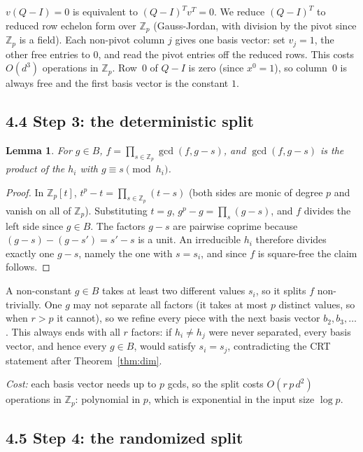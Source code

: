 \documentclass[11pt,a4paper]{article}
\newtheorem{lemma}[theorem]{Lemma}
\newcommand{\Zp}{\mathbb{Z}_p}
\begin{document}
$v (Q - I) = 0$ is equivalent to $(Q - I)^{T} v^{T} = 0$. We reduce $(Q - I)^{T}$ to reduced row
echelon form over $\Zp$ (Gauss-Jordan, with division by the pivot since $\Zp$ is a field). Each
non-pivot column $j$ gives one basis vector: set $v_j = 1$, the other free entries to $0$, and
read the pivot entries off the reduced rows. This costs $O(d^3)$ operations in $\Zp$. Row~$0$ of
$Q - I$ is zero (since $x^0 = 1$), so column~$0$ is always free and the first basis vector is
the constant $1$.

\subsection*{4.4 Step 3: the deterministic split}

\begin{lemma}
\label{lem:split}
For $g \in B$, $\displaystyle f = \prod_{s \in \Zp} \gcd(f, g - s)$, and $\gcd(f, g - s)$ is the
product of the $h_i$ with $g \equiv s \pmod{h_i}$.
\end{lemma}

\begin{proof}
In $\Zp[t]$, $t^p - t = \prod_{s \in \Zp}(t - s)$ (both sides are monic of degree $p$ and vanish
on all of $\Zp$). Substituting $t = g$, $g^p - g = \prod_{s}(g - s)$, and $f$ divides the left
side since $g \in B$. The factors $g - s$ are pairwise coprime because $(g - s) - (g - s') =
s' - s$ is a unit. An irreducible $h_i$ therefore divides exactly one $g - s$, namely the one with
$s = s_i$, and since $f$ is square-free the claim follows.
\end{proof}

A non-constant $g \in B$ takes at least two different values $s_i$, so it splits $f$
non-trivially. One $g$ may not separate all factors (it takes at most $p$ distinct values, so
when $r > p$ it cannot), so we refine every piece with the next basis vector $b_2, b_3, \dots$.
This always ends with all $r$ factors: if $h_i \neq h_j$ were never separated, every basis vector,
and hence every $g \in B$, would satisfy $s_i = s_j$, contradicting the CRT statement after
Theorem~\ref{thm:dim}.

\emph{Cost:} each basis vector needs up to $p$ gcds, so the split costs $O(r\,p\,d^2)$ operations in
$\Zp$: polynomial in $p$, which is exponential in the input size $\log p$.

\subsection*{4.5 Step 4: the randomized split}
\end{document}

